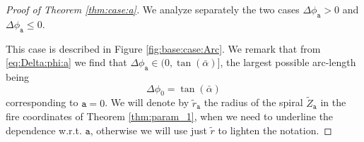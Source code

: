 \documentclass[reqno]{amsart}
\theoremstyle{definition} \newtheorem{definition}{Definition}[section]
\theoremstyle{definition} \newtheorem{remark}[definition]{Remark}
\theoremstyle{plain} \newtheorem{lemma}[definition]{Lemma}
\theoremstyle{plain} \newtheorem{proposition}[definition]{Proposition}
\theoremstyle{plain} \newtheorem{theorem}[definition]{Theorem}
\theoremstyle{plain} \newtheorem{corollary}[definition]{Corollary}
\theoremstyle{definition} \newtheorem{example}[definition]{Example}
\theoremstyle{plain} \newtheorem{claim}[clai]{Claim}
\theoremstyle{definition} \newtheorem{assumption}[definition]{Assumption}
\theoremstyle{definition} \newtheorem{observation}[definition]{Observation}
\newcommand{\1}{\mathbbm 1}
\numberwithin{equation}{section} %
\theoremstyle{plain} \newtheorem*{theorem*}{Theorem}
\theoremstyle{plain} \newtheorem{mthm}[maintheorem]{Main Theorem}
\theoremstyle{plain} \newtheorem*{mthm*}{Main Theorem}
\theoremstyle{plain} \newtheorem*{conjecture*}{Conjecture}
\theoremstyle{plain} \newtheorem{conjecture}[definition]{Conjecture}
\theoremstyle{plain} \newtheorem*{problem*}{Problem}
\begin{document}
\begin{proof}[Proof of Theorem \ref{thm:case:a}]
We analyze separately the two cases $\Delta\phi_{\mathtt a} > 0$ and $\Delta\phi_{\mathtt a}\leq 0$.

\medskip

 This case is described in Figure \ref{fig:base:case:Arc}. We remark that from \eqref{eq:Delta:phi:a} we find that $\Delta \phi_{\mathtt a} \in (0,\tan(\bar \alpha)]$, the largest possible arc-length being
\begin{equation*}
\Delta \phi_0 = \tan(\bar \alpha)
\end{equation*}
corresponding to $\mathtt a = 0$. We will denote by $\tilde r_{\mathtt a}$ the radius of the spiral $\tilde Z_{\mathtt a}$ in the fire coordinates of Theorem \ref{thm:param_1}, when we need to underline the dependence w.r.t. $\mathtt a$, otherwise we will use just $\tilde r$ to lighten the notation.

\medskip


\end{proof}
\end{document}
